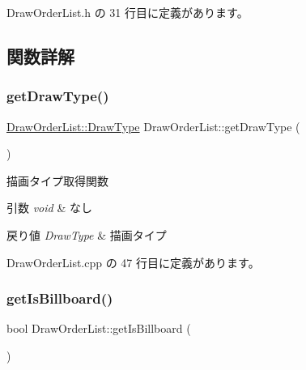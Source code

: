 Draw\+Order\+List.\+h の 31 行目に定義があります。



\subsection{関数詳解}
\mbox{\label{class_draw_order_list_a88af7401a2ecb32be3fcf5408946cd29}} 
\subsubsection{\texorpdfstring{get\+Draw\+Type()}{getDrawType()}}
{\footnotesize\ttfamily \mbox{\hyperlink{class_draw_order_list_a6c9b9ceb312c16d399ef355f4f3486bb}{Draw\+Order\+List\+::\+Draw\+Type}} Draw\+Order\+List\+::get\+Draw\+Type (\begin{DoxyParamCaption}{ }\end{DoxyParamCaption})}



描画タイプ取得関数 


\begin{DoxyParams}{引数}
{\em void} & なし \\
\hline
\end{DoxyParams}

\begin{DoxyRetVals}{戻り値}
{\em Draw\+Type} & 描画タイプ \\
\hline
\end{DoxyRetVals}


 Draw\+Order\+List.\+cpp の 47 行目に定義があります。

\mbox{\label{class_draw_order_list_a5d49272331a0f6f8656839ba5fe5e1b6}} 
\subsubsection{\texorpdfstring{get\+Is\+Billboard()}{getIsBillboard()}}
{\footnotesize\ttfamily bool Draw\+Order\+List\+::get\+Is\+Billboard (\begin{DoxyParamCaption}{ }\end{DoxyParamCaption})}



